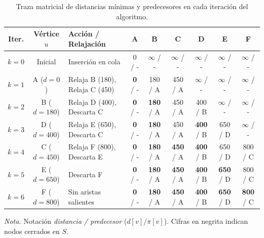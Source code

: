 \begin{table}[H]
    \centering
    \setlength{\tabcolsep}{3.5pt}
    \fontsize{10}{12.5}\selectfont
    \caption{Traza matricial de distancias mínimas y predecesores en cada iteración del algoritmo.}
    \label{tab:traza_detallada}
    \begin{tabular}{@{}cclcccccc@{}}
        \toprule
        \textbf{Iter.} & \textbf{Vértice $u$} & \textbf{Acción / Relajación} & \textbf{A} & \textbf{B} & \textbf{C} & \textbf{D} & \textbf{E} & \textbf{F} \\
        \midrule
        $k=0$ & Inicial & Inserción en cola & 0 / - & $\infty$ / - & $\infty$ / - & $\infty$ / - & $\infty$ / - & $\infty$ / - \\
        $k=1$ & A ($d=0$) & Relaja B (180), Relaja C (450) & \textbf{0} / - & 180 / A & 450 / A & $\infty$ / - & $\infty$ / - & $\infty$ / - \\
        $k=2$ & B ($d=180$) & Relaja D (400), Descarta C & \textbf{0} / - & \textbf{180} / A & 450 / A & 400 / B & $\infty$ / - & $\infty$ / - \\
        $k=3$ & D ($d=400$) & Relaja E (650), Descarta C & \textbf{0} / - & \textbf{180} / A & 450 / A & \textbf{400} / B & 650 / D & $\infty$ / - \\
        $k=4$ & C ($d=450$) & Relaja F (800), Descarta E & \textbf{0} / - & \textbf{180} / A & \textbf{450} / A & \textbf{400} / B & 650 / D & 800 / C \\
        $k=5$ & E ($d=650$) & Descarta F & \textbf{0} / - & \textbf{180} / A & \textbf{450} / A & \textbf{400} / B & \textbf{650} / D & 800 / C \\
        $k=6$ & F ($d=800$) & Sin aristas salientes & \textbf{0} / - & \textbf{180} / A & \textbf{450} / A & \textbf{400} / B & \textbf{650} / D & \textbf{800} / C \\
        \bottomrule
    \end{tabular}
    \par\vspace{0.15cm}
    \raggedright
    \textit{Nota.} Notación \textit{distancia / predecesor} ($d[v] / \pi[v]$). Cifras en negrita indican nodos cerrados en $S$.
\end{table}
